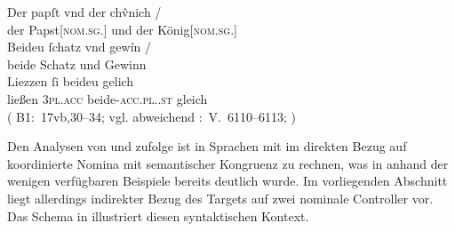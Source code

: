 \begin{exe}
\ex\label{ex:papstkoenig5} %
	\gll Der papſt vnd der chv̂nich {/} \\
		der Papst[\textsc{nom.sg.\MascM}] und der König[\textsc{nom.sg.\MascM}]
		\\
	\textelp{}
	\gll Beideu ſchatz vnd gewín {/} \\
		beide Schatz und Gewinn \\
	\gll Liezzen ſi beideu gelich \\
		ließen \textsc{3pl\subM.acc} beide-\textsc{acc.pl.\NeutM.st} gleich \\
	\trans {}
		(%
			B1:~17vb,30--34; vgl. abweichend
			\KC:~V.~6110--6113;
			\cite[202]{schroeder1895}%
		)
\end{exe}

Den Analysen von \citet{wechsler2009} und \citet{wechslerzlatic2003} zufolge
ist in Sprachen mit  im direkten Bezug auf koordinierte
Nomina mit semantischer Kongruenz zu rechnen, was in
 anhand der wenigen verfügbaren Beispiele bereits
deutlich wurde. Im vorliegenden Abschnitt liegt allerdings indirekter Bezug des
Targets  auf zwei nominale Controller vor. Das Schema in
 illustriert diesen syntaktischen Kontext.

